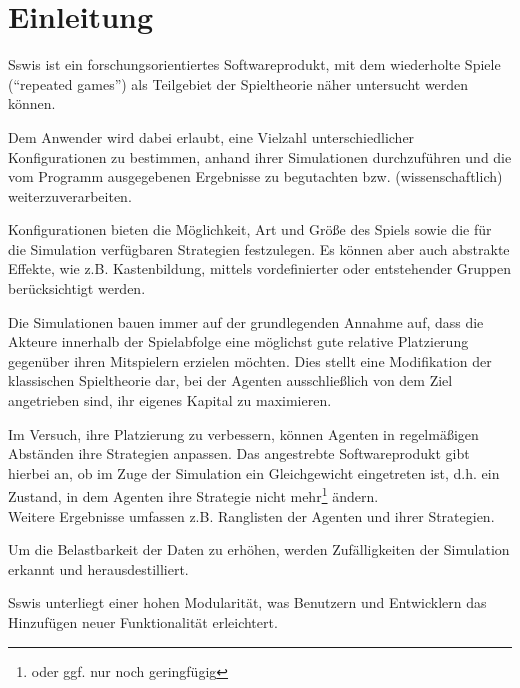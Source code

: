 \section{Einleitung}

Sswis ist ein forschungsorientiertes Softwareprodukt, mit dem wiederholte Spiele ("`repeated games"') als Teilgebiet der Spieltheorie näher untersucht werden können.

Dem Anwender wird dabei erlaubt, eine Vielzahl unterschiedlicher Konfigurationen zu bestimmen, anhand ihrer Simulationen durchzuführen und die vom Programm ausgegebenen Ergebnisse zu begutachten bzw. (wissenschaftlich) weiterzuverarbeiten.

Konfigurationen bieten die Möglichkeit, Art und Größe des Spiels sowie die für die Simulation verfügbaren Strategien festzulegen. Es können aber auch abstrakte Effekte, wie z.B. Kastenbildung, mittels vordefinierter oder entstehender Gruppen berücksichtigt werden.

Die Simulationen bauen immer auf der grundlegenden Annahme auf, dass die Akteure innerhalb der Spielabfolge eine möglichst gute relative Platzierung gegenüber ihren Mitspielern erzielen möchten.
Dies stellt eine Modifikation der klassischen Spieltheorie dar, bei der Agenten ausschließlich von dem Ziel angetrieben sind, ihr eigenes Kapital zu maximieren.

Im Versuch, ihre Platzierung zu verbessern, können Agenten in regelmäßigen Abständen ihre Strategien anpassen.
Das angestrebte Softwareprodukt gibt hierbei an, ob im Zuge der Simulation ein Gleichgewicht eingetreten ist, d.h. ein Zustand, in dem Agenten ihre Strategie nicht mehr\footnote{oder ggf. nur noch geringfügig} ändern.\\
Weitere Ergebnisse umfassen z.B. Ranglisten der Agenten und ihrer Strategien.

Um die Belastbarkeit der Daten zu erhöhen, werden Zufälligkeiten der Simulation erkannt und herausdestilliert.

Sswis unterliegt einer hohen Modularität, was Benutzern und Entwicklern das Hinzufügen neuer Funktionalität erleichtert.